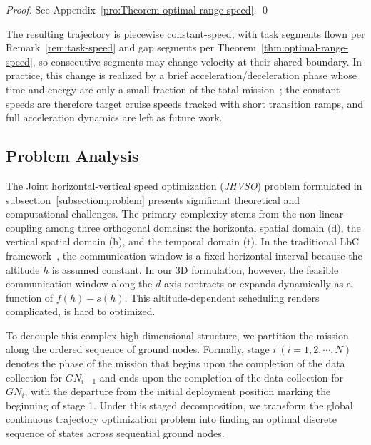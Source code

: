 \begin{proof}
See Appendix~\ref{pro:Theorem optimal-range-speed}.
\qed
\end{proof}

\begin{remark}
\label{rem:acc-dec}
    The resulting trajectory is piecewise constant-speed, with task segments flown per Remark~\ref{rem:task-speed} and gap segments per Theorem~\ref{thm:optimal-range-speed}, so consecutive segments may change velocity at their shared boundary. In practice, this change is realized by a brief acceleration/deceleration phase whose time and energy are only a small fraction of the total mission~\cite{msmo}; the constant speeds are therefore target cruise speeds tracked with short transition ramps, and full acceleration dynamics are left as future work.
\end{remark}




\subsection{Problem Analysis}

The Joint horizontal-vertical speed optimization (\textit{JHVSO}) problem formulated in subsection~\ref{subsection:problem} presents significant theoretical and computational challenges.
The primary complexity stems from the non-linear coupling among three orthogonal domains: the horizontal spatial domain (d), the vertical spatial domain (h), and the temporal domain (t).
In the traditional LbC framework~\cite{lbc}, the communication window is a fixed horizontal interval because the altitude $h$ is assumed constant.
In our 3D formulation, however, the feasible communication window along the $d$-axis contracts or expands dynamically as a function of $f(h)-s(h)$.
This altitude-dependent scheduling renders complicated, is hard to optimized.

To decouple this complex high-dimensional structure, we partition the mission along the ordered sequence of ground nodes.
Formally, stage $i\ (i=1,2,\cdots ,N)$ denotes the phase of the mission that begins upon the completion of the data collection for $GN_{i-1}$ and ends upon the completion of the data collection for $GN_i$, with the departure from the initial deployment position marking the beginning of stage 1.
Under this staged decomposition, we transform the global continuous trajectory optimization problem into finding an optimal discrete sequence of states across sequential ground nodes.


